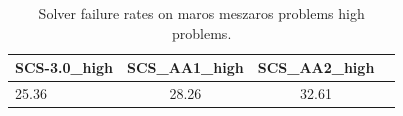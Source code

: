 \begin{table}
\centering
\caption{Solver failure rates on maros meszaros problems high problems.}
\label{t-maros meszaros problems high-failure}
\begin{tabular}{lccc}
\toprule
 SCS-3.0\_high &  SCS\_AA1\_high &  SCS\_AA2\_high \\
\midrule
        25.36 &         28.26 &         32.61 \\
\bottomrule
\end{tabular}
\end{table}
